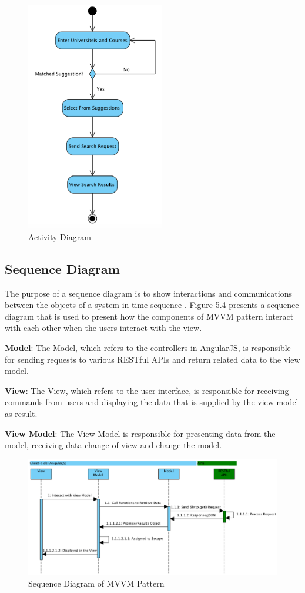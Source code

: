 \begin{figure}[H]
  \centering
  \includegraphics[width=6cm]{./img/Picture9}
  \caption{Activity Diagram
}
  \label{Figure:figex}
\end{figure}



\subsection{Sequence Diagram}
The purpose of a sequence diagram is to show interactions and communications between the objects of a system in time sequence \cite{IBM2}. Figure 5.4 presents a sequence diagram that is used to present how the components of MVVM pattern interact with each other when the users interact with the view.

\textbf{Model}: The Model, which refers to the controllers in AngularJS, is responsible for sending requests to various RESTful APIs and return related data to the view model.

\textbf{View}: The View, which refers to the user interface, is responsible for receiving commands from users and displaying the data that is supplied by the view model as result. 

\textbf{View Model}: The View Model is responsible for presenting data from the model, receiving data change of view and change the model.



\begin{figure}[H]
  \centering
  \includegraphics[width=16cm]{./img/Picture10}
  \caption{Sequence Diagram of MVVM Pattern}
  \label{Figure:figex}
\end{figure}



